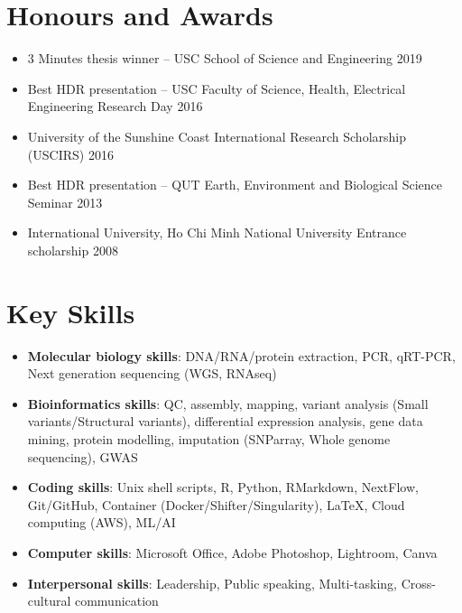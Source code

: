 \documentclass[letterpaper,11pt]{article}
\newcommand{\resumeItem}[2]{
  \item\small{
    \textbf{#1}{: #2 \vspace{0pt}}
  }
}
\newcommand{\resumeRef}[2]{
  \item\small{
    \textbf{#1} {#2}}
  }
\newcommand{\resumeBlack}[1]{\item\small{{#1}}}
\newcommand{\resumeSubItem}[2]{\resumeItem{#1}{#2}}
\newcommand{\resumeItemListStart}{\begin{itemize}}
\newcommand{\resumeItemListEnd}{\end{itemize}}
\begin{document}
\section{Honours and Awards}
\resumeItemListStart
	\resumeBlack{3 Minutes thesis winner – USC School of Science and Engineering 2019}
	\resumeBlack{Best HDR presentation – USC Faculty of Science, Health, Electrical Engineering Research Day 2016}
  	\resumeBlack{University of the Sunshine Coast International Research Scholarship (USCIRS) 2016}
  	\resumeBlack{Best HDR presentation –  QUT Earth, Environment and Biological Science Seminar 2013}
  	\resumeBlack{International University, Ho Chi Minh National University Entrance scholarship 2008}
\resumeItemListEnd  

\section{Key Skills}
 \resumeItemListStart
    \resumeSubItem{Molecular biology skills}{DNA/RNA/protein extraction, PCR, qRT-PCR, Next generation sequencing (WGS, RNAseq)}
    \resumeSubItem{Bioinformatics skills}{QC, assembly, mapping, variant analysis (Small variants/Structural variants), differential expression analysis, gene data mining, protein modelling, imputation (SNParray, Whole genome sequencing), GWAS}
    \resumeSubItem{Coding skills}{Unix shell scripts, R, Python, RMarkdown, NextFlow, Git/GitHub, Container (Docker/Shifter/Singularity), LaTeX, Cloud computing (AWS), ML/AI}
    \resumeSubItem{Computer skills}{Microsoft Office, Adobe Photoshop, Lightroom, Canva}
    \resumeSubItem{Interpersonal skills}{Leadership, Public speaking, Multi-tasking, Cross-cultural communication}
  \resumeItemListEnd

  
\end{document}
